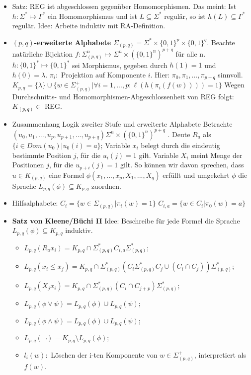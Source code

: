 \documentclass[12pt, a4paper]{article}
\begin{document}
\begin{itemize}
		\item Satz: REG ist abgeschlossen gegenüber Homomorphismen.
			\subitem Das meint: Ist $h:\Sigma^{*}\mapsto\Gamma^{*}$ ein Homomorphismus und ist $L\subseteq\Sigma^{*}$ regulär, so ist $h(L)\subseteq\Gamma^{*}$ regulär.
			\subitem Idee: Arbeite induktiv mit RA-Definition.
		
		\item $(p, q)$\textbf{-erweiterte Alphabete} $\Sigma_{(p,q)}=\Sigma^{*}\times\{0,1\}^{p}\times \{0,1\}^{q}$.
			\subitem Beachte natürliche Bijektion $f:\Sigma^{n}_{(p,q)}\mapsto\Sigma^{n}\times(\{0,1\}^{n})^{p+q}$ für alle n.
			\subitem $h:\{0,1\}^{*}\mapsto\{0,1\}^{*}$ sei Morphismus, gegeben durch $h(1) = 1$ und $h(0)=\lambda$.
			\subitem $\pi_{i}:$ Projektion auf Komponente $i$. Hier: $\pi_{0},\pi_{1},...,\pi_{p+q}$ sinnvoll.
			\subitem $K_{p,q}=\{\lambda\}\cup\{w\in\Sigma^{+}_{(p,q)}|\forall i=1,...,p:\ell(h(\pi_{i} (f(w)))) = 1\}$
			\subitem Wegen Durchschnitts- und Homomorphismen-Abgeschlossenheit von REG folgt: $K_{(p,q)}\in$ REG.
		
		\item Zusammenhang Logik zweiter Stufe und erweiterte Alphabete
			\subitem Betrachte $(u_{0},u_{1},...,u_{p},u_{p+1},...,u_{p+q})\Sigma^{n}\times(\{0, 1\}^{n})^{p+q}$ .
			\subitem Deute $R_{a}$ als $\{i\in Dom(u_{0})|u_{0}(i)=a\}$;
			\subitem Variable $x_{i}$ belegt durch die eindeutig bestimmte Position $j$, für die $u_{i}(j)= 1$ gilt.
			\subitem Variable $X_{i}$ meint Menge der Positionen $j$, für die $u_{p+i}(j)=1$ gilt.
			\subitem So können wir davon sprechen, dass $u\in K_{(p,q)}$ eine Formel $\phi(x_{1},...,x_{p},X_{1},...,X_{q})$ erfüllt und umgekehrt $\phi$ die Sprache $L_{p,q}(\phi)\subseteq K_{p,q}$ zuordnen.
		
		\item Hilfsalphabete:
			\subitem $C_{i}=\{w\in\Sigma_{(p,q)}|\pi_{i}(w)=1\}$
			\subitem $C_{i,a}=\{w\in C_{i}|\pi_{0}(w)=a\}$
		
		\item \textbf{Satz von Kleene/Büchi II}
		Idee: Beschreibe für jede Formel die Sprache $L_{p,q}(\phi)\subseteq K_{p,q}$ induktiv.
		\begin{itemize}
			\item $L_{p,q}(R_{a}x_{i})=K_{p,q}\cap\Sigma^{*}_{(p,q)}C_{i,a}\Sigma^{*}_{(p,q)}$;
			\item $L_{p,q}(x_{i}\leq x_{j} )=K_{p,q}\cap\Sigma^{*}_{(p,q)}(C_{i}\Sigma^{*}_{(p,q)}C_{j}\cup(C_{i}\cap C_{j}))\Sigma^{*}_{(p,q)};$
			\item $L_{p,q}(X_{j}x_{i})=K_{p,q}\cap\Sigma^{*}_{(p,q)}(C_{i}\cap C_{j+p})\Sigma^{*}_{(p,q)};$
			\item $L_{p,q}(\phi\vee\psi)=L_{p,q}(\phi)\cup L_{p,q}(\psi);$
			\item $L_{p,q}(\phi\wedge\psi) = L_{p,q}(\phi)\cup L_{p,q}(\psi);$
			\item $L_{p,q}(\neg ) = K_{p,q}\setminus L_{p,q}(\phi);$
			\item $l_{i}(w):$ Löschen der i-ten Komponente von $w\in\Sigma^{+}_{(p,q)}$, interpretiert als $f(w)$.
		\end{itemize}
		

\end{itemize}
\end{document}
